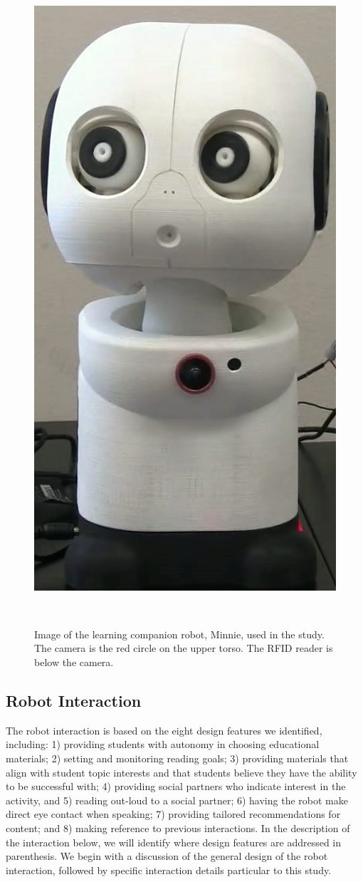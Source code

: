 \documentclass{sigchi}
\begin{document}
\begin{figure}
	\centering
	\includegraphics[width=0.6\columnwidth]{figures/minnie}
	\caption{Image of the learning companion robot, Minnie, used in the study. The camera is the red circle on the upper torso. The RFID reader is below the camera. }~\label{fig:figure2}
\end{figure}

\subsection{Robot Interaction}

The robot interaction is based on the eight design features we identified, including: 1) providing students with autonomy in choosing educational materials; 2) setting and monitoring reading goals; 3) providing materials that align with student topic interests and that students believe they have the ability to be successful with; 4) providing social partners who indicate interest in the activity, and 5) reading out-loud to a social partner; 6) having the robot make direct eye contact when speaking; 7) providing tailored recommendations for content; and 8) making reference to previous interactions. In the description of the interaction below, we will identify where design features are addressed in parenthesis. We begin with a discussion of the general design of the robot interaction, followed by specific interaction details particular to this study.
\end{document}
